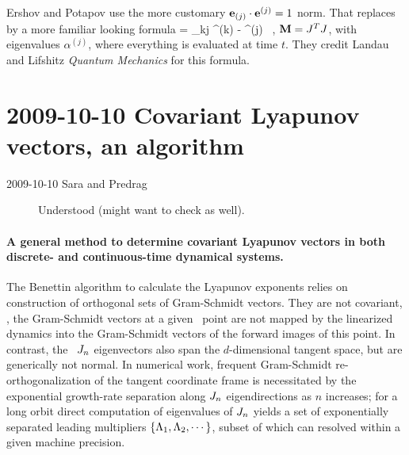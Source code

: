 Ershov and Potapov use the more customary
$\jEigvecT[j] \cdot \jEigvec[j] =1$ norm. That replaces
 by a more familiar looking formula
\beq
\delta \jEigvec[j] = \sum_{k\neq j}
              {\alpha^{(k)} - \alpha^{(j)}}
       \jEigvec[k]
\, ,
${\bf M} = \jMps^T \jMps$, with eigenvalues $\alpha^{(j)}$,
where everything is evaluated at time $t$. They credit Landau
and Lifshitz
{\em Quantum Mechanics} for this formula.

\section{2009-10-10  Covariant Lyapunov vectors, an algorithm}

\begin{description}
\item[2009-10-10 Sara and Predrag] Understood
 (might want to
check  as well).
\end{description}

\paragraph{
A general method to
determine covariant Lyapunov vectors in both discrete- and
continuous-time dynamical systems.
            }

The Benettin \etal{} algorithm to calculate the
Lyapunov exponents relies on construction of orthogonal sets of
Gram-Schmidt vectors. They  are not covariant, \ie, the
Gram-Schmidt vectors at a given \statesp\ point are not mapped
by the linearized dynamics into the Gram-Schmidt vectors of the
forward images of this point. In contrast, the \jacobianM\
$\jMps_n$ eigenvectors \jEigvec[i] also span the
$d$-dimensional tangent space, but are generically not normal.
In numerical work, frequent Gram-Schmidt re-orthogonalization
of the tangent coordinate frame is necessitated by the
exponential growth-rate separation along $\jMps_n$
eigendirections as $n$ increases; for a long orbit direct
computation of eigenvalues of $\jMps_n$ yields a set of
exponentially separated leading multipliers
$\{\ExpaEig_1,\ExpaEig_2,\cdots\}$, subset of which can
resolved within a given machine precision.

